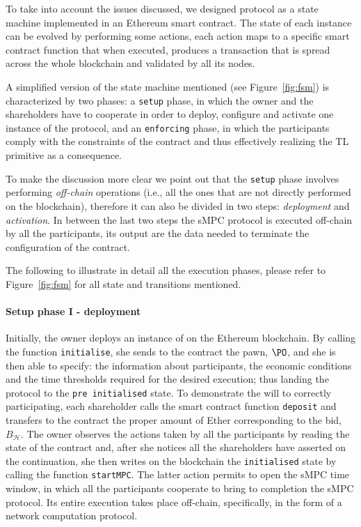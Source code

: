 To take into account the issues discussed, we designed \shortname protocol as a state machine implemented in an Ethereum smart contract. The state of each instance can be evolved by performing some actions, each action maps to a specific smart contract function that when executed, produces a transaction that is spread across the whole blockchain and validated by all its nodes.

A simplified version of the state machine mentioned (see Figure~\ref{fig:fsm}) is characterized by two phases: a \texttt{setup} phase, in which the owner and the shareholders have to cooperate in order to deploy, configure and activate one instance of the protocol, and an \texttt{enforcing} phase, in which the participants comply with the constraints of the contract and thus effectively realizing the TL primitive as a consequence.

%
To make the discussion more clear we point out that the \texttt{setup} phase involves performing {\em off-chain} operations (i.e., all the ones that are not directly performed on the blockchain), therefore it can also be divided in two steps: {\em deployment} and {\em activation}. In between the last two steps the sMPC protocol is executed off-chain by all the participants, its output are the data needed to terminate the configuration of the contract.

The following to illustrate in detail all the execution phases, please refer to Figure~\ref{fig:fsm} for all state and transitions mentioned. 

\medskip

\paragraph*{Setup phase I - deployment}
Initially, the owner deploys an instance of \shortname on the Ethereum blockchain. 
By calling the function \texttt{initialise}, she sends to the contract the pawn, $\PO$, and she is then able to specify: the information about participants, the economic conditions and the time thresholds required for the desired execution; thus landing the protocol to the \texttt{pre initialised} state. 
To demonstrate the will to correctly participating, each shareholder calls the smart contract function \texttt{deposit} and transfers to the contract the proper amount of Ether corresponding to the bid, $B_{\mathcal{H}}$. 
The owner observes the actions taken by all the participants by reading the state of the contract and, after she notices all the shareholders have asserted on the continuation, she then writes on the blockchain the \texttt{initialised} state by calling the function \texttt{startMPC}. The latter action permits to open the sMPC time window, in which all the participants cooperate to bring to completion the sMPC protocol. Its entire execution takes place off-chain, specifically, in the form of a network computation protocol.

